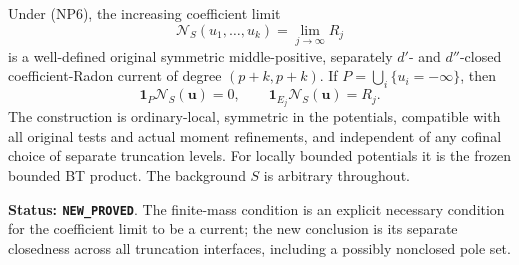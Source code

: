 \begin{theorem}
\label{thm:r11-closed-nonpolar-product}
Under (NP6), the increasing coefficient limit
\[
 \mathcal N_S(u_1,\ldots,u_k)=\lim_{j\to\infty}R_j
 \tag{NP7}
\]
is a well-defined original symmetric middle-positive,
separately $d'$- and $d''$-closed coefficient-Radon current of degree
$(p+k,p+k)$.  If
$P=\bigcup_i\{u_i=-\infty\}$, then
\[
 \mathbf1_P\mathcal N_S(\mathbf u)=0,
 \qquad
 \mathbf1_{E_j}\mathcal N_S(\mathbf u)=R_j.
 \tag{NP8}
\]
The construction is ordinary-local, symmetric in the potentials,
compatible with all original tests and actual moment refinements,
and independent of any cofinal choice of separate truncation levels.
For locally bounded potentials it is the frozen bounded BT product.
The background $S$ is arbitrary throughout.
\end{theorem}

\noindent\textbf{Status: \texttt{NEW\_PROVED}}.  The finite-mass
condition is an explicit necessary condition for the coefficient limit
to be a current; the new conclusion is its separate closedness across
all truncation interfaces, including a possibly nonclosed pole set.

